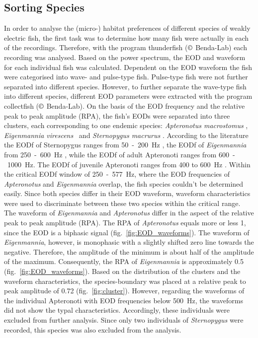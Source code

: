 \subsection{Sorting Species}
In order to analyse the (micro-) habitat preferences of different species of weakly electric fish, the first task was to determine how many fish were actually in each of the recordings. Therefore, with the program thunderfish ($\copyright$ Benda-Lab) each recording was analysed. Based on the power spectrum, the EOD and waveform for each individual fish was calculated.
Dependent on the EOD waveform the fish were categorised into wave- and pulse-type fish. Pulse-type fish were not further separated into different species. However, to further separate the wave-type fish into different species, different EOD parameters were extracted with the program collectfish ($\copyright$ Benda-Lab). On the basis of the EOD frequency and the relative peak to peak amplitude (RPA), the fish's EODs were separated into three clusters, each corresponding to one endemic species: \textit{Apteronotus macrostomus} \citep{Santana2013}, \textit{Eigenmannia virescens}~\citep{silva2009cytogenetic} and \textit{Sternopygus macrurus} \citep{Keller1991}. According to the literature the EODf of Sternopygus ranges from 50~-~200~Hz \citep{Keller1991}, the EODf of \textit{Eigenmannia} from 250~-~600~Hz \citep{Hopkins_74}, while the EODf of adult Apteronoti ranges from 600~-~1000~Hz. The EODf of juvenile Apteronoti ranges from 400 to 600~Hz \citep{Meyer1987}.
Within the critical EODf window of 250~-~577~Hz, where the EOD frequencies of \textit{Apteronotus} and \textit{Eigenmannia} overlap, the fish species couldn't be determined easily. Since both species differ in their EOD waveform, waveform characteristics were used to discriminate between these two species within the critical range. The waveform of \textit{Eigenmannia} and \textit{Apteronotus} differ in the aspect of the relative peak to peak amplitude (RPA). The RPA of \textit{Apteronotus} equals more or less 1, since the EOD is a biphasic signal \citep{Zupanc_Bullock_2005} (fig.~\ref{fig:EOD_waveforms}). The waveform of \textit{Eigenmannia}, however, is monophasic \citep{Zupanc_Bullock_2005} with a slightly shifted zero line towards the negative. Therefore, the amplitude of the minimum is about half of the amplitude of the maximum. Consequently, the RPA of \textit{Eigenmannia} is approximately 0.5 (fig.~\ref{fig:EOD_waveforms}). Based on the distribution of the clusters and the waveform characteristics, the species-boundary was placed at a relative peak to peak amplitude of 0.72 (fig.~\ref{fig:cluster}). However, regarding the waveforms of the individual Apteronoti with EOD frequencies below 500~Hz, the waveforms did not show the typal characteristics. Accordingly, these individuals were excluded from further analysis. Since only two individuals of \textit{Sternopygus} were recorded, this species was also excluded from the analysis.

